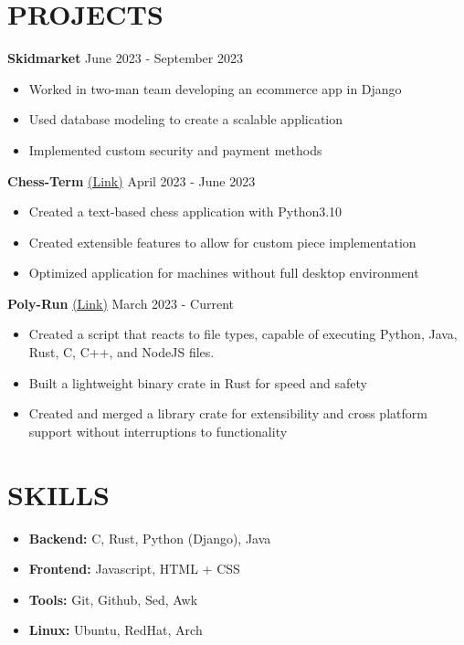 \documentclass[a4paper,9pt]{extarticle}
\begin{document}


\section*{PROJECTS}
\noindent
\textbf{Skidmarket} \hfill June 2023 - September 2023
\begin{itemize}
    \item Worked in two-man team developing an ecommerce app in Django 
    \item Used database modeling to create a scalable application 
    \item Implemented custom security and payment methods 
\end{itemize}
\noindent
\textbf{Chess-Term} %
\href{https://github.com/oritzau/chess-Term}{(Link)}
\hfill April 2023 - June 2023 %
\begin{itemize}    
    \item Created a text-based chess application with Python3.10 
    \item Created extensible features to allow for custom piece implementation  
    \item Optimized application for machines without full desktop environment 
\end{itemize}

\noindent
\textbf{Poly-Run} %
\href{https://github.com/oritzau/poly-run/tree/master}{(Link)}
\hfill March 2023 - Current %
\begin{itemize}
    \item Created a script that reacts to file types, capable of executing 
        Python, Java, Rust, C, C++, and NodeJS files. 
    \item Built a lightweight binary crate in Rust for speed and safety 
    \item Created and merged a library crate for extensibility and cross 
        platform support without interruptions to functionality 
\end{itemize}

\section*{SKILLS}
\begin{itemize}
    \item \textbf{Backend:} C, Rust, Python (Django), Java
    \item \textbf{Frontend:} Javascript, HTML + CSS 
    \item \textbf{Tools:} Git, Github, Sed, Awk
    \item \textbf{Linux:} Ubuntu, RedHat, Arch
\end{itemize}
\end{document}
